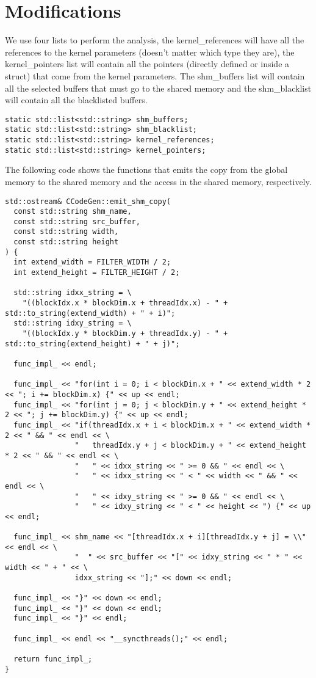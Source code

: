 \documentclass{article}
\begin{document}
\section{Modifications}

We use four lists to perform the analysis, the kernel\_references will have all the references to the kernel parameters (doesn't matter which type they are), the kernel\_pointers list will contain all the pointers (directly defined or inside a struct) that come from the kernel parameters. The shm\_buffers list will contain all the selected buffers that must go to the shared memory and the shm\_blacklist will contain all the blacklisted buffers.

\begin{verbatim}
static std::list<std::string> shm_buffers;
static std::list<std::string> shm_blacklist;
static std::list<std::string> kernel_references;
static std::list<std::string> kernel_pointers;
\end{verbatim}

The following code shows the functions that emits the copy from the global memory to the shared memory and the access in the shared memory, respectively.

\begin{verbatim}
std::ostream& CCodeGen::emit_shm_copy(
  const std::string shm_name,
  const std::string src_buffer,
  const std::string width,
  const std::string height
) {
  int extend_width = FILTER_WIDTH / 2;
  int extend_height = FILTER_HEIGHT / 2;

  std::string idxx_string = \
    "((blockIdx.x * blockDim.x + threadIdx.x) - " + std::to_string(extend_width) + " + i)";
  std::string idxy_string = \
    "((blockIdx.y * blockDim.y + threadIdx.y) - " + std::to_string(extend_height) + " + j)";

  func_impl_ << endl;

  func_impl_ << "for(int i = 0; i < blockDim.x + " << extend_width * 2 << "; i += blockDim.x) {" << up << endl;
  func_impl_ << "for(int j = 0; j < blockDim.y + " << extend_height * 2 << "; j += blockDim.y) {" << up << endl;
  func_impl_ << "if(threadIdx.x + i < blockDim.x + " << extend_width * 2 << " && " << endl << \
                "   threadIdx.y + j < blockDim.y + " << extend_height * 2 << " && " << endl << \
                "   " << idxx_string << " >= 0 && " << endl << \
                "   " << idxx_string << " < " << width << " && " << endl << \
                "   " << idxy_string << " >= 0 && " << endl << \
                "   " << idxy_string << " < " << height << ") {" << up << endl;

  func_impl_ << shm_name << "[threadIdx.x + i][threadIdx.y + j] = \\" << endl << \
                "  " << src_buffer << "[" << idxy_string << " * " << width << " + " << \
                idxx_string << "];" << down << endl;

  func_impl_ << "}" << down << endl;
  func_impl_ << "}" << down << endl;
  func_impl_ << "}" << endl;

  func_impl_ << endl << "__syncthreads();" << endl;

  return func_impl_;
}

\end{verbatim}
\end{document}
